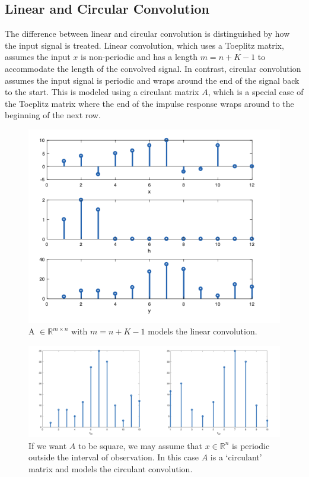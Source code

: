 \subsection{Linear and Circular Convolution}
The difference between linear and circular convolution is distinguished by how the input signal is treated. Linear convolution, which uses a Toeplitz matrix, assumes the input \( x \) is non-periodic and has a length \( m = n + K - 1 \) to accommodate the length of the convolved signal. In contrast, circular convolution assumes the input signal is periodic and wraps around the end of the signal back to the start. This is modeled using a circulant matrix \( A \), which is a special case of the Toeplitz matrix where the end of the impulse response wraps around to the beginning of the next row.


\begin{figure}[H]
    \centering
    \includegraphics[width=0.5\linewidth]{img/linear_conv.png}
    \caption{A \(\in \mathbb{R}^{m \times n}\) with \(m = n + K - 1\) models the linear convolution.
}
    \label{fig:linear_conv}
\end{figure}


\begin{figure}[H]
    \centering
    \includegraphics[width=1\linewidth]{img/cir_conv.png}
    \caption{If we want \(A\) to be square, we may assume that \(x \in \mathbb{R}^n\) is periodic outside the interval of observation. In this case \(A\) is a `circulant' matrix and models the circulant convolution.}
    \label{fig:circ-conv}
\end{figure}


